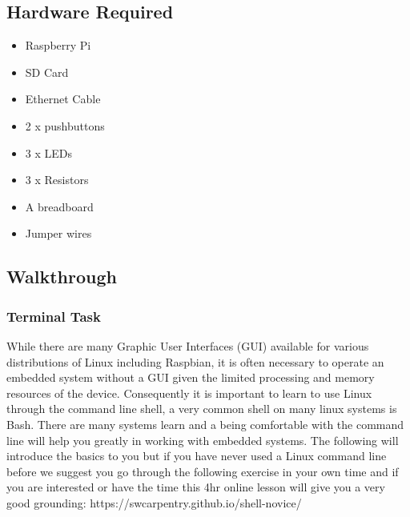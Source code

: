 \subsection{Hardware Required}
\begin{itemize}
    \item Raspberry Pi
    \item SD Card
    \item Ethernet Cable
    \item 2 x pushbuttons
    \item 3 x LEDs
    \item 3 x Resistors
    \item A breadboard
    \item Jumper wires
\end{itemize}

\subsection{Walkthrough}
\subsubsection{Terminal Task}
\label{sec:Prac1:Terminal}
While there are many Graphic User Interfaces (GUI) available for various distributions of Linux including Raspbian, it is often necessary to operate an embedded system without a GUI given the limited processing and memory resources of the device.  Consequently it is important to learn to use Linux through the command line shell, a very common shell on many linux systems is Bash.  There are many systems learn and a being comfortable with the command line will help you greatly in working with embedded systems.  The following will introduce the basics to you but if you have never used a Linux command line before we suggest you go through the following exercise in your own time  and if you are interested or have the time this 4hr online lesson will give you a very good grounding: https://swcarpentry.github.io/shell-novice/


